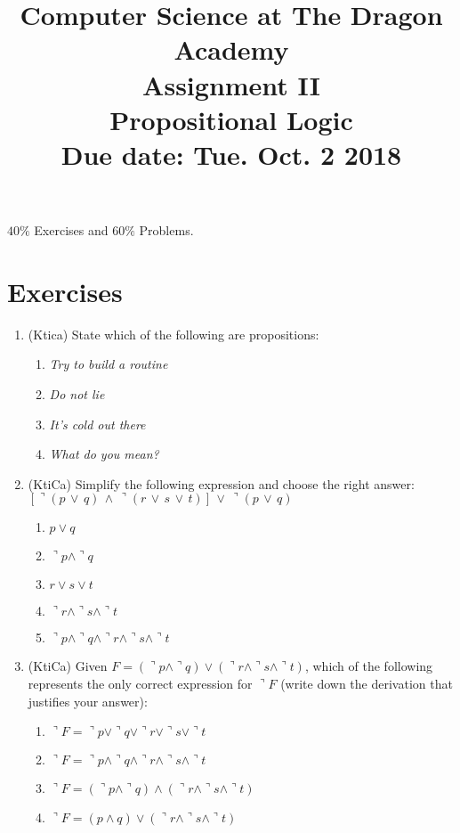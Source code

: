 \documentclass{article}
\title{
Computer Science at The Dragon Academy\\
Assignment II\\
Propositional Logic\\
{\bf Due date: Tue. Oct. 2 2018}
}
\begin{document}
\maketitle
$40\%$ Exercises and $60\%$ Problems. 
\section{Exercises}
\begin{enumerate}
\item (Ktica) State which of the following are propositions:
\begin{enumerate}
\item {\sl Try to build a routine}
\item {\sl Do not lie}
\item {\sl It's cold out there}
\item {\sl What do you mean?}
\end{enumerate}
\item (KtiCa) Simplify the following expression and choose the right answer: $\left[\urcorner \left(p\,\vee\,q\right)\,\wedge\,\urcorner\left(r\,\vee\,s\,\vee\,t\right)\right]\,\vee\,\urcorner\left(p\,\vee\,q\right)$
\begin{enumerate}
\item $p\vee q$
\item $\urcorner p \wedge \urcorner q$
\item $r \vee s \vee t$
\item $\urcorner r \wedge \urcorner s \wedge \urcorner t$
\item $\urcorner p \wedge \urcorner q \wedge \urcorner r \wedge \urcorner s \wedge \urcorner t$
\end{enumerate}
\item (KtiCa) Given $F=\left( \urcorner p \wedge \urcorner q \right)\vee \left( \urcorner r \wedge \urcorner s \wedge \urcorner t\right)$, which of the following represents 
the only correct expression for $\urcorner F$ (write down the derivation that justifies your answer):
\begin{enumerate}
\item $\urcorner F=\urcorner p \vee \urcorner q \vee \urcorner r \vee \urcorner s \vee \urcorner t$
\item $\urcorner F=\urcorner p \wedge \urcorner q \wedge \urcorner r \wedge \urcorner s \wedge \urcorner t$
\item $\urcorner F=\left(\urcorner p \wedge \urcorner q \right) \wedge \left(\urcorner r \wedge \urcorner s \wedge \urcorner t\right)$
\item $\urcorner F=\left(  p \wedge  q \right)\vee \left( \urcorner r \wedge \urcorner s \wedge \urcorner t\right)$

\end{enumerate}
\end{enumerate}
\end{document}
